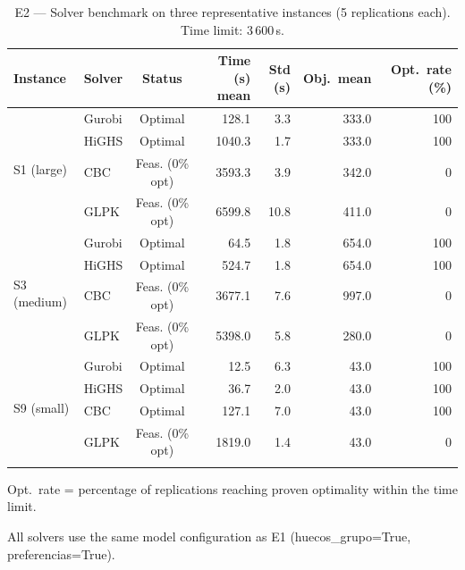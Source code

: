 \begin{table}[htbp]
\centering
\caption{E2 --- Solver benchmark on three representative instances (5 replications each). Time limit: 3\,600\,s.}
\label{tab:e2_benchmark}
\scriptsize
\begin{tabular}{llcrrrr}
\toprule
\textbf{Instance} & \textbf{Solver} & \textbf{Status}
  & \textbf{Time (s) mean} & \textbf{Std (s)} & \textbf{Obj.\ mean} & \textbf{Opt.\ rate (\%)} \\
\midrule
  \multirow{4}{*}{S1 (large)} & Gurobi & Optimal & 128.1 & 3.3 & 333.0 & 100 \\
   & HiGHS & Optimal & 1040.3 & 1.7 & 333.0 & 100 \\
   & CBC & Feas. (0\% opt) & 3593.3 & 3.9 & 342.0 & 0 \\
   & GLPK & Feas. (0\% opt) & 6599.8 & 10.8 & 411.0 & 0 \\
\midrule
  \multirow{4}{*}{S3 (medium)} & Gurobi & Optimal & 64.5 & 1.8 & 654.0 & 100 \\
   & HiGHS & Optimal & 524.7 & 1.8 & 654.0 & 100 \\
   & CBC & Feas. (0\% opt) & 3677.1 & 7.6 & 997.0 & 0 \\
   & GLPK & Feas. (0\% opt) & 5398.0 & 5.8 & 280.0 & 0 \\
\midrule
  \multirow{4}{*}{S9 (small)} & Gurobi & Optimal & 12.5 & 6.3 & 43.0 & 100 \\
   & HiGHS & Optimal & 36.7 & 2.0 & 43.0 & 100 \\
   & CBC & Optimal & 127.1 & 7.0 & 43.0 & 100 \\
   & GLPK & Feas. (0\% opt) & 1819.0 & 1.4 & 43.0 & 0 \\
\botrule
\end{tabular}
\begin{tablenotes}
\small
\item Opt.\ rate = percentage of replications reaching proven optimality within the time limit.
\item All solvers use the same model configuration as E1 (huecos\_grupo=True, preferencias=True).
\end{tablenotes}
\end{table}
